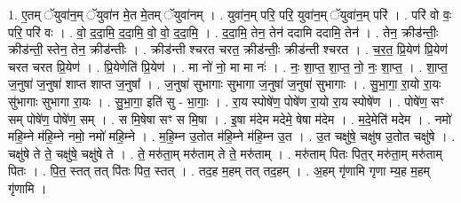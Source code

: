 \documentclass[17pt]{extarticle}
\begin{document}
1. ए॒तम् ॅयुवा॑न॒म् ॅयुवा॑न मे॒त मे॒तम् ॅयुवा॑नम् । . युवा॑न॒म् परि॒ परि॒ युवा॑न॒म् ॅयुवा॑न॒म् परि॑ । . परि॑ वो वः॒ परि॒ परि॑ वः । . वो॒ द॒दा॒मि॒ द॒दा॒मि॒ वो॒ वो॒ द॒दा॒मि॒ । . द॒दा॒मि॒ तेन॒ तेन॑ ददामि ददामि॒ तेन॑ । . तेन॒ क्रीड॑न्तीः॒ क्रीड॑न्ती॒ स्तेन॒ तेन॒ क्रीड॑न्तीः । . क्रीड॑न्ती श्चरत चरत॒ क्रीड॑न्तीः॒ क्रीड॑न्ती श्चरत । . च॒र॒त॒ प्रि॒येण॑ प्रि॒येण॑ चरत चरत प्रि॒येण॑ । . प्रि॒येणेति॑ प्रि॒येण॑ । . मा नो॑ नो॒ मा मा नः॑ । . नः॒ शा॒प्त॒ शा॒प्त॒ नो॒ नः॒ शा॒प्त॒ । . शा॒प्त॒ ज॒नुषा॑ ज॒नुषा॑ शाप्त शाप्त ज॒नुषा᳚ । . ज॒नुषा॑ सुभागाः सुभागा ज॒नुषा॑ ज॒नुषा॑ सुभागाः । . सु॒भा॒गा॒ रा॒यो रा॒यः सु॑भागाः सुभागा रा॒यः । . सु॒भा॒गा॒ इति॑ सु - भा॒गाः॒ । . रा॒य स्पोषे॑ण॒ पोषे॑ण रा॒यो रा॒य स्पोषे॑ण । . पोषे॑ण॒ सꣳ सम् पोषे॑ण॒ पोषे॑ण॒ सम् । . स मि॒षेषा सꣳ स मि॒षा । . इ॒षा म॑देम मदेमे॒ षेषा म॑देम । . म॒दे॒मेति॑ मदेम । . नमो॑ महि॒म्ने म॑हि॒म्ने नमो॒ नमो॑ महि॒म्ने । . म॒हि॒म्न उ॒तोत म॑हि॒म्ने म॑हि॒म्न उ॒त । . उ॒त चक्षु॑षे॒ चक्षु॑ष उ॒तोत चक्षु॑षे । . चक्षु॑षे ते ते॒ चक्षु॑षे॒ चक्षु॑षे ते । . ते॒ मरु॑ता॒म् मरु॑ताम् ते ते॒ मरु॑ताम् । . मरु॑ताम् पितः पित॒र् मरु॑ता॒म् मरु॑ताम् पितः । . पि॒त॒ स्तत् तत् पि॑तः पित॒ स्तत् । . तद॒ह म॒हम् तत् तद॒हम् । . अ॒हम् गृ॑णामि गृणा म्य॒ह म॒हम् गृ॑णामि । \newline
\end{document}
